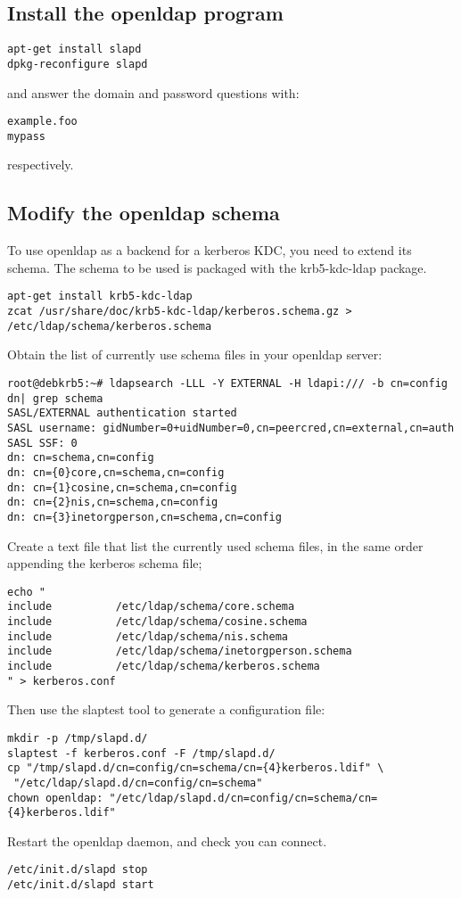 \documentclass[12pt,a4]{article}
\begin{document}
\subsection{Install the openldap program}
\begin{verbatim}
apt-get install slapd
dpkg-reconfigure slapd
\end{verbatim}
and answer the domain and password questions with:
\begin{verbatim}
example.foo
mypass
\end{verbatim}
respectively.

\subsection{Modify the openldap schema}
To use openldap as a backend for a kerberos KDC, you need to extend its schema.
The schema to be used is packaged with the  krb5-kdc-ldap package.
\begin{verbatim}
apt-get install krb5-kdc-ldap
zcat /usr/share/doc/krb5-kdc-ldap/kerberos.schema.gz > /etc/ldap/schema/kerberos.schema
\end{verbatim}

Obtain the list of currently use schema files in your openldap server:

\begin{verbatim}
root@debkrb5:~# ldapsearch -LLL -Y EXTERNAL -H ldapi:/// -b cn=config dn| grep schema
SASL/EXTERNAL authentication started
SASL username: gidNumber=0+uidNumber=0,cn=peercred,cn=external,cn=auth
SASL SSF: 0
dn: cn=schema,cn=config
dn: cn={0}core,cn=schema,cn=config
dn: cn={1}cosine,cn=schema,cn=config
dn: cn={2}nis,cn=schema,cn=config
dn: cn={3}inetorgperson,cn=schema,cn=config
\end{verbatim}

Create a text file that list the currently used schema files, in the same order appending the kerberos schema file;
\begin{verbatim}
echo "
include          /etc/ldap/schema/core.schema
include          /etc/ldap/schema/cosine.schema
include          /etc/ldap/schema/nis.schema
include          /etc/ldap/schema/inetorgperson.schema
include          /etc/ldap/schema/kerberos.schema
" > kerberos.conf 
\end{verbatim}
Then use the slaptest tool to generate a configuration file:
\begin{verbatim}
mkdir -p /tmp/slapd.d/
slaptest -f kerberos.conf -F /tmp/slapd.d/
cp "/tmp/slapd.d/cn=config/cn=schema/cn={4}kerberos.ldif" \
 "/etc/ldap/slapd.d/cn=config/cn=schema"
chown openldap: "/etc/ldap/slapd.d/cn=config/cn=schema/cn={4}kerberos.ldif"
\end{verbatim}
Restart the openldap daemon, and check you can connect.
\begin{verbatim}
/etc/init.d/slapd stop
/etc/init.d/slapd start
\end{verbatim}
\end{document}
